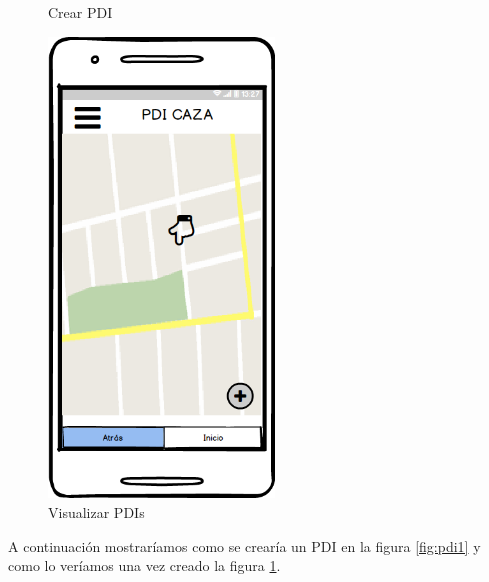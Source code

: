 \begin{figure}[H]
\begin{minipage}[b]{0.5\linewidth}
\caption{Crear PDI}
\label{fig:pdi1}
\end{minipage}
\hspace{0.5cm} %
\begin{minipage}[b]{0.5\linewidth}
\centering
\includegraphics[width=6cm]{maqueta/pdi2.png}

\caption{Visualizar PDIs}
\label{fig:pdi2}
\end{minipage}
\end{figure}
	
 A continuación mostraríamos como se crearía un PDI en la figura  \ref{fig:pdi1} y como lo veríamos una vez creado la figura \ref{fig:pdi2}.	

